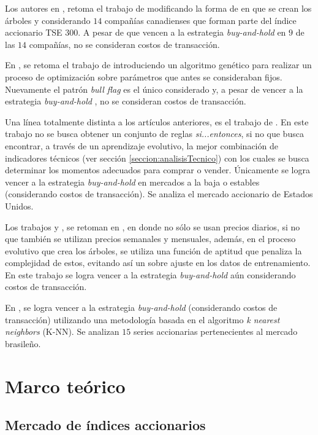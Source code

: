 \documentclass[12pt]{scrbook}
\theoremstyle{break}
\theoremstyle{break}
\newcommand{\buyhold}{\textit{buy-and-hold} }
\begin{document}
Los autores en \cite{Potvin2004}, retoma el trabajo de \cite{Allen1999} modificando la forma de en que se crean los árboles y considerando $14$ compañías canadienses que forman parte del índice accionario TSE $300$. A pesar de que vencen a la estrategia \buyhold en $9$ de las $14$ compañías, no se consideran costos de transacción.

En \cite{Parracho2010}, se retoma el trabajo de \cite{Leigh2002} introduciendo un algoritmo genético para realizar un proceso de optimización sobre parámetros que antes se consideraban fijos. Nuevamente el patrón \textit{bull flag} es el único considerado y, a pesar de vencer a la estrategia \buyhold, no se consideran costos de transacción.

Una línea totalmente distinta a los artículos anteriores, es el trabajo de \cite{Kaucic2010}. En este trabajo no se busca obtener un conjunto de reglas \textit{si...entonces}, si no que busca encontrar, a través de un aprendizaje evolutivo, la mejor combinación de indicadores técnicos (ver sección \ref{seccion:analisisTecnico}) con los cuales se busca determinar los momentos adecuados para comprar o vender. Únicamente se logra vencer a la estrategia \buyhold en mercados a la baja o estables (considerando costos de transacción). Se analiza el mercado accionario de Estados Unidos.

Los trabajos \cite{Allen1999} y \cite{Potvin2004}, se retoman en \cite{Lohpetch2010}, en donde no sólo se usan precios diarios, si no que también se utilizan precios semanales y mensuales, además, en el proceso evolutivo que crea los árboles, se utiliza una función de aptitud que penaliza la complejidad de estos, evitando así un sobre ajuste en los datos de entrenamiento. En este trabajo se logra vencer a la estrategia \buyhold aún considerando costos de transacción.

En \cite{Teixeira2010}, se logra vencer a la estrategia \buyhold (considerando costos de transacción) utilizando una metodología basada en el algoritmo \textit{k nearest neighbors} (K-NN). Se analizan $15$ series accionarias pertenecientes al mercado brasileño.

\chapter{Marco teórico}
\label{capitulo:marco teorico}

\section{Mercado de índices accionarios}
\label{seccion:indices accionarios}
\end{document}
